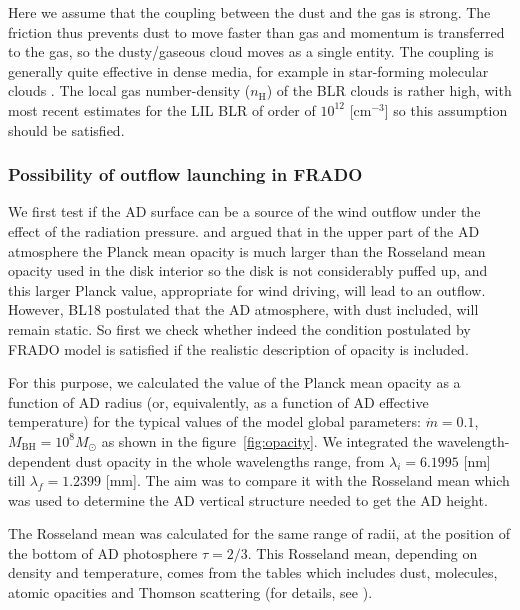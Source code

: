 \documentclass[twocolumn]{aastex62}
\begin{document}
Here we assume that the coupling between the dust and the gas is strong. The friction thus prevents dust to move faster than gas and momentum is transferred to the gas, so the dusty/gaseous cloud moves as a single entity. The coupling is generally quite effective in dense media, for example in star-forming molecular clouds \citep[e.g.][]{reissl2018, Hosseinirad2018}. The local gas number-density ($n_{\mathrm{H}}$)
of the BLR clouds is rather high, with most recent estimates for the LIL BLR of order of $10^{12}$ [cm$^{-3}$] \citep[e.g.][]{tek2016, panda2018, panda2019a, panda2019b, panda2020, panda2020a, panda2020b} so this assumption should be satisfied.

\subsubsection{Possibility of outflow launching in FRADO}

We first test if the AD surface can be a source of the wind outflow under the effect of the radiation pressure. \citet{Czerny2015} and \citet{Czerny2017} argued that in the upper part of the AD atmosphere the Planck mean opacity is much larger than the Rosseland mean opacity used in the disk interior so the disk is not considerably puffed up, and this larger Planck value, appropriate for wind driving, will lead to an outflow. However, BL18 postulated that the AD atmosphere, with dust included, will remain static. So first we check whether indeed the condition postulated by FRADO model is satisfied if the realistic description of opacity is included.

For this purpose, we calculated the value of the Planck mean opacity as a function of AD radius (or, equivalently, as a function of AD effective temperature) for the typical values of the model global parameters: $\dot m = 0.1$, $M_{\mathrm{BH}} = 10^8 M_{\odot}$ as shown in the figure~\ref{fig:opacity}. We integrated the wavelength-dependent dust opacity in the whole wavelengths range, from $\lambda_{i} = 6.1995$ [nm] till $\lambda_{f} = 1.2399$ [mm]. The aim was to compare it with the Rosseland mean which was used to determine the AD vertical structure needed to get the AD height.

The Rosseland mean was calculated for the same range of radii, at the position of the bottom of AD photosphere $\tau = 2/3$. This Rosseland mean, depending on density and temperature, comes from the tables which includes dust, molecules, atomic opacities and Thomson scattering (for details, see \citealt{rozanska1999}).
\end{document}

